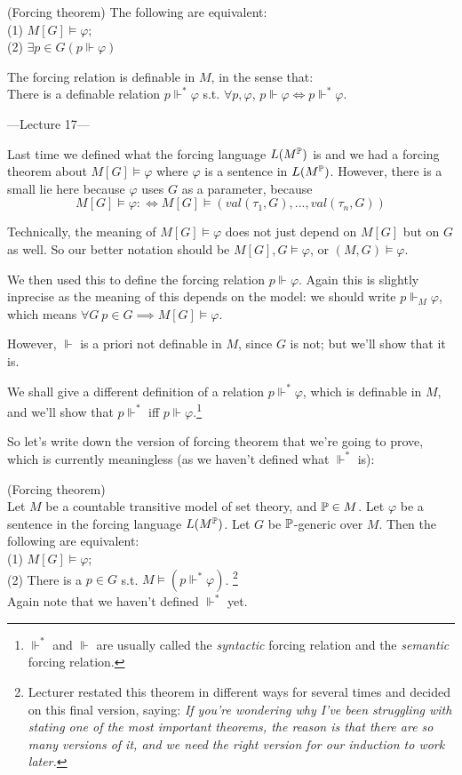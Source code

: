 \documentclass[a4paper]{article}
\begin{document}
\begin{thm} (Forcing theorem)
The following are equivalent:\\
(1) $M[G] \vDash \varphi$;\\
(2) $\exists p \in G (p \Vdash \varphi)$
\end{thm}

\begin{thm}
The forcing relation is definable in $M$, in the sense that:\\
There is a definable relation $p \Vdash^* \varphi$ s.t. $\forall p,\varphi$, $p \Vdash \varphi \iff p \Vdash^* \varphi$.
\end{thm}

---Lecture 17---

Last time we defined what the forcing language $L(M^\P)$ is and we had a forcing theorem about $M[G] \vDash \varphi$ where $\varphi$ is a sentence in $L(M^\P)$. However, there is a small lie here because $\varphi$ uses $G$ as a parameter, because
\[
M[G] \vDash \varphi :\iff M[G] \vDash (val(\tau_1,G),...,val(\tau_n,G))
\]

Technically, the meaning of $M[G] \vDash \varphi$ does not just depend on $M[G]$ but on $G$ as well. So our better notation should be $M[G],G \vDash \varphi$, or $(M,G) \vDash \varphi$.

We then used this to define the forcing relation $p \Vdash \varphi$. Again this is slightly inprecise as the meaning of this depends on the model: we should write $p \Vdash_M \varphi$, which means $\forall G\ p \in G \implies M[G] \vDash \varphi$.

However, $\Vdash$ is a priori not definable in $M$, since $G$ is not; but we'll show that it is.

We shall give a different definition of a relation $p \Vdash^* \varphi$, which is definable in $M$, and we'll show that $p \Vdash^*$ iff $p \Vdash \varphi$.\footnote{$\Vdash^*$ and $\Vdash$ are usually called the \emph{syntactic} forcing relation and the \emph{semantic} forcing relation.}

So let's write down the version of forcing theorem that we're going to prove, which is currently meaningless (as we haven't defined what $\Vdash^*$ is):
\begin{thm} (Forcing theorem)\\
Let $M$ be a countable transitive model of set theory, and $\P \in M$. Let $\varphi$ be a sentence in the forcing language $L(M^\P)$. Let $G$ be $\P$-generic over $M$. Then the following are equivalent:\\
(1) $M[G] \vDash \varphi$;\\
(2) There is a $p \in G$ s.t. $M \vDash (p \Vdash^* \varphi)$. \footnote{Lecturer restated this theorem in different ways for several times and decided on this final version, saying: \emph{If you're wondering why I've been struggling with stating one of the most important theorems, the reason is that there are so many versions of it, and we need the right version for our induction to work later.}}\\
Again note that we haven't defined $\Vdash^*$ yet.
\end{thm}
\end{document}

